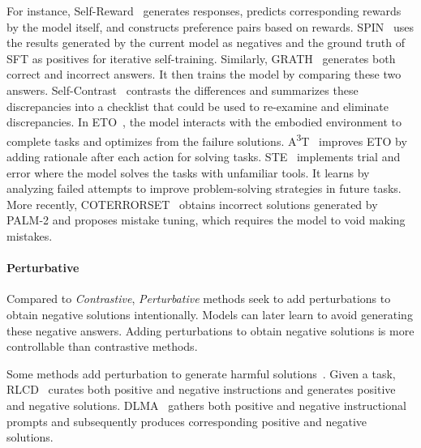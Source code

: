\documentclass[sn-basic, Numbered]{sn-jnl}%
\theoremstyle{thmstyleone}%
\theoremstyle{thmstyletwo}%
\theoremstyle{thmstylethree}%
\begin{document}
For instance, Self-Reward~\cite{yuan2024self} generates responses, predicts corresponding rewards by the model itself, and constructs preference pairs based on rewards. SPIN~\cite{chen2024self} uses the results generated by the current model as negatives and the ground truth of SFT as positives for iterative self-training.
Similarly, GRATH~\cite{chen2024grath} generates both correct and incorrect answers. It then trains the model by comparing these two answers.
Self-Contrast~\cite{zhang2024selfcontrast} contrasts the differences and summarizes these discrepancies into a checklist that could be used to re-examine and eliminate discrepancies.
In ETO~\cite{song2024trial}, the model interacts with the embodied environment to complete tasks and optimizes from the failure solutions.
A\textsuperscript{3}T~\cite{yang2024react} improves ETO by adding rationale after each action for solving tasks. 
STE~\cite{wang2024llms} implements trial and error where the model solves the tasks with unfamiliar tools. It learns by analyzing failed attempts to improve problem-solving strategies in future tasks.
More recently, COTERRORSET~\cite{tong2024can} obtains incorrect solutions generated by PALM-2 and proposes mistake tuning, which requires the model to void making mistakes.
 


\noindent\paragraph{Perturbative}
Compared to \textit{Contrastive}, \textit{Perturbative} methods seek to add perturbations to obtain negative solutions intentionally.
Models can later learn to avoid generating these negative answers.
Adding perturbations to obtain negative solutions is more controllable than contrastive methods. 

Some methods add perturbation to generate harmful solutions~\cite{yang2023rlcd, liu2024direct}.
Given a task, RLCD~\cite{yang2023rlcd} curates both positive and negative instructions and generates positive and negative solutions.
DLMA~\cite{liu2024direct} gathers both positive and negative instructional prompts and subsequently produces corresponding positive and negative solutions.
\end{document}
